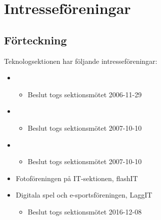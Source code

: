 \section{Intresseföreningar}

\subsection{Förteckning}

Teknologsektionen har följande intresseföreningar:

\begin{itemize}
	\item \EIGHTBITFULL{}
	\begin{itemize} 
		\item Beslut togs sektionsmötet 2006-11-29
	\end{itemize}
	\item \DRAWITFULL{}
	\begin{itemize} 
		\item Beslut togs sektionsmötet 2007-10-10
	\end{itemize}
	\item \HOOKITFULL{}
	\begin{itemize} 
		\item Beslut togs sektionsmötet 2007-10-10
	\end{itemize}
	\item Fotoföreningen på IT-sektionen, flashIT
	\item Digitala spel och e-sportsföreningen, LaggIT
	\begin{itemize}
		\item Beslut togs sektionsmötet 2016-12-08
	\end{itemize}
\end{itemize}